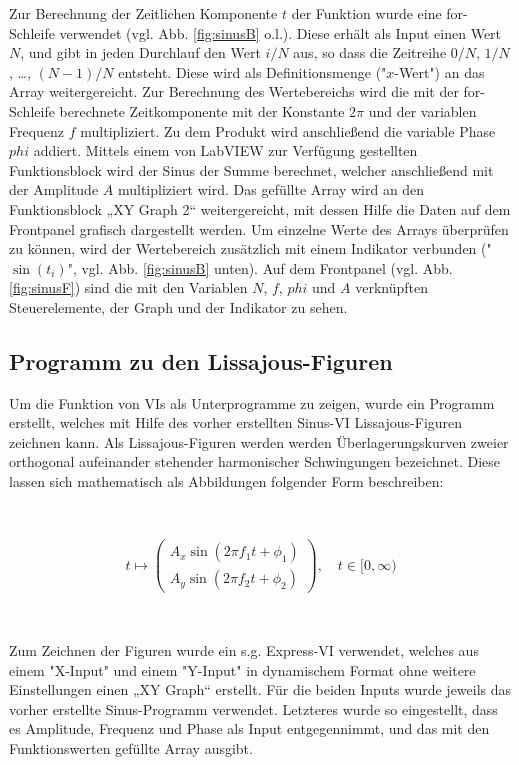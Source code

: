 Zur Berechnung der Zeitlichen Komponente $t$ der Funktion wurde eine for-Schleife verwendet (vgl. Abb. \ref{fig:sinusB} o.l.). Diese erhält als Input einen Wert $N$, und gibt in jeden Durchlauf den Wert $i/N$ aus, so dass die Zeitreihe $0/N$, $1/N$, …, $(N-1)/N$ entsteht. Diese wird als Definitionsmenge ("$x$-Wert") an das Array weitergereicht. Zur Berechnung des Wertebereichs wird die mit der for-Schleife berechnete Zeitkomponente mit der Konstante $2 \pi$ und der variablen Frequenz $f$ multipliziert. Zu dem Produkt wird anschließend die variable Phase $phi$ addiert. Mittels einem von LabVIEW zur Verfügung gestellten Funktionsblock wird der Sinus der Summe berechnet, welcher anschließend mit der Amplitude $A$ multipliziert wird. Das gefüllte Array wird an den Funktionsblock „XY Graph 2“ weitergereicht, mit dessen Hilfe die Daten auf dem Frontpanel grafisch dargestellt werden. Um einzelne Werte des Arrays überprüfen zu können, wird der Wertebereich zusätzlich mit einem Indikator verbunden ("$\sin(t_i)$", vgl. Abb. \ref{fig:sinusB} unten).
Auf dem Frontpanel (vgl. Abb. \ref{fig:sinusF}) sind die mit den Variablen $N$, $f$, $phi$  und $A$ verknüpften Steuerelemente, der Graph und der Indikator zu sehen. 

\subsection{Programm zu den Lissajous-Figuren}

Um die Funktion von VIs als Unterprogramme zu zeigen, wurde ein Programm erstellt, welches mit Hilfe des vorher erstellten Sinus-VI Lissajous-Figuren zeichnen kann. Als Lissajous-Figuren werden werden Überlagerungskurven zweier orthogonal aufeinander stehender harmonischer Schwingungen bezeichnet. Diese lassen sich mathematisch als Abbildungen folgender Form beschreiben:

\

\begin{equation}
 t \mapsto 	\begin{pmatrix}
		 A_x\sin(2\pi f_1 t + \phi_1) \\ 
		 A_y\sin(2\pi f_2 t + \phi_2)
	 \end{pmatrix},
	 \quad	t \in [0,\infty)
\end{equation}

\

Zum Zeichnen der Figuren wurde ein s.g. Express-VI verwendet, welches aus einem "X-Input" und einem "Y-Input" in dynamischem Format ohne weitere Einstellungen einen „XY Graph“ erstellt. Für die beiden Inputs wurde jeweils das vorher erstellte Sinus-Programm verwendet. Letzteres wurde so eingestellt, dass es Amplitude, Frequenz und Phase als Input entgegennimmt, und das mit den Funktionswerten gefüllte Array ausgibt.

